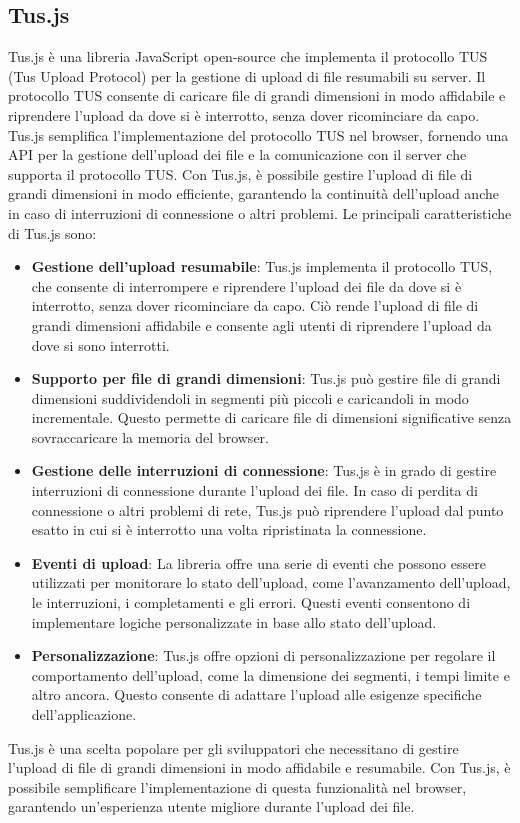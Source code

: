 \subsection{Tus.js}
Tus.js è una libreria JavaScript open-source che implementa il protocollo TUS (Tus Upload Protocol) per la gestione di upload di file resumabili su server. Il protocollo TUS consente di caricare file di grandi dimensioni in modo affidabile e riprendere l'upload da dove si è interrotto, senza dover ricominciare da capo.
Tus.js semplifica l'implementazione del protocollo TUS nel browser, fornendo una API per la gestione dell'upload dei file e la comunicazione con il server che supporta il protocollo TUS. Con Tus.js, è possibile gestire l'upload di file di grandi dimensioni in modo efficiente, garantendo la continuità dell'upload anche in caso di interruzioni di connessione o altri problemi.
Le principali caratteristiche di Tus.js sono:
\begin{itemize}
    \item \textbf{Gestione dell'upload resumabile}: Tus.js implementa il protocollo TUS, che consente di interrompere e riprendere l'upload dei file da dove si è interrotto, senza dover ricominciare da capo. Ciò rende l'upload di file di grandi dimensioni affidabile e consente agli utenti di riprendere l'upload da dove si sono interrotti.
  \item \textbf{Supporto per file di grandi dimensioni}: Tus.js può gestire file di grandi dimensioni suddividendoli in segmenti più piccoli e caricandoli in modo incrementale. Questo permette di caricare file di dimensioni significative senza sovraccaricare la memoria del browser.
  \item \textbf{Gestione delle interruzioni di connessione}: Tus.js è in grado di gestire interruzioni di connessione durante l'upload dei file. In caso di perdita di connessione o altri problemi di rete, Tus.js può riprendere l'upload dal punto esatto in cui si è interrotto una volta ripristinata la connessione.
  \item \textbf{Eventi di upload}: La libreria offre una serie di eventi che possono essere utilizzati per monitorare lo stato dell'upload, come l'avanzamento dell'upload, le interruzioni, i completamenti e gli errori. Questi eventi consentono di implementare logiche personalizzate in base allo stato dell'upload.
  \item \textbf{Personalizzazione}: Tus.js offre opzioni di personalizzazione per regolare il comportamento dell'upload, come la dimensione dei segmenti, i tempi limite e altro ancora. Questo consente di adattare l'upload alle esigenze specifiche dell'applicazione.
\end{itemize}
Tus.js è una scelta popolare per gli sviluppatori che necessitano di gestire l'upload di file di grandi dimensioni in modo affidabile e resumabile. Con Tus.js, è possibile semplificare l'implementazione di questa funzionalità nel browser, garantendo un'esperienza utente migliore durante l'upload dei file.
